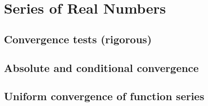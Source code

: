 
\section{Series of Real Numbers}

\subsection{Convergence tests (rigorous)}


\subsection{Absolute and conditional convergence}


\subsection{Uniform convergence of function series}

